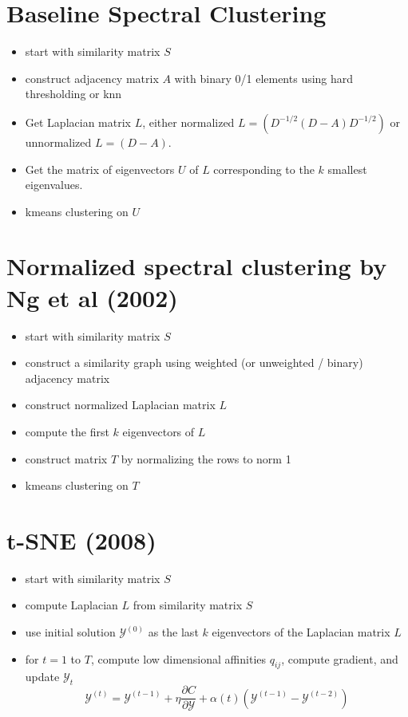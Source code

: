 \documentclass[11pt]{article}
\begin{document}
\section*{Baseline Spectral Clustering}

\begin{itemize}
\item start with similarity matrix $S$
\item construct adjacency matrix $A$ with binary 0/1 elements using hard thresholding or knn
\item Get Laplacian matrix $L$, either normalized $L = (D^{-1/2} (D-A) D^{-1/2})$ or unnormalized $L = (D-A)$.
\item Get the matrix of eigenvectors $U$ of $L$ corresponding to the $k$ smallest eigenvalues. 
\item kmeans clustering on $U$
\end{itemize}


\section*{Normalized spectral clustering by Ng et al (2002)}
\begin{itemize}
\item start with similarity matrix $S$
\item construct a similarity graph using weighted (or unweighted / binary) adjacency matrix
\item construct normalized Laplacian matrix $L$
\item compute the first $k$ eigenvectors of $L$
\item construct matrix $T$ by normalizing the rows to norm 1
\item kmeans clustering on $T$
\end{itemize}

\section*{t-SNE (2008)}
\begin{itemize}
\item start with similarity matrix $S$
\item compute Laplacian $L$ from similarity matrix $S$
\item use initial solution $\mathcal{Y}^{(0)}$ as the last $k$ eigenvectors of the Laplacian matrix $L$
\item for $t = 1$ to $T$, compute low dimensional affinities $q_{ij}$, compute gradient, and update $\mathcal{Y}_t$
$$\mathcal{Y}^{(t)} = \mathcal{Y}^{(t-1)} + \eta \frac{\partial C}{\partial \mathcal{Y}} + \alpha (t) (\mathcal{Y}^{(t-1)} - \mathcal{Y}^{(t-2)})$$
\end{itemize}
\end{document}
